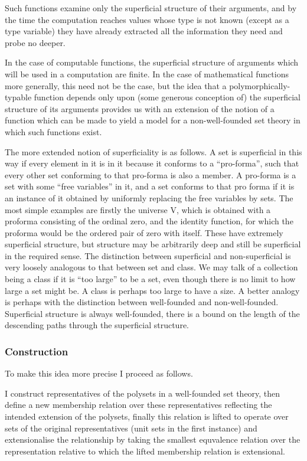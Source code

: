 \documentclass{article}
\begin{document}
\begin{article}
Such functions examine only the superficial structure of their arguments, and by the time the computation reaches values whose type is not known (except as a type variable) they have already extracted all the information they need and probe no deeper.

In the case of computable functions, the superficial structure of arguments which will be used in a computation are finite.
In the case of mathematical functions more generally, this need not be the case, but the idea that a polymorphically-typable function depends only upon (some generous conception of) the superficial structure of its arguments provides us with an extension of the notion of a function which can be made to yield a model for a non-well-founded set theory in which such functions exist.

The more extended notion of superficiality is as follows.
A set is superficial in this way if every element in it is in it because it conforms to a ``pro-forma'', such that every other set conforming to that pro-forma is also a member.
A pro-forma is a set with some ``free variables'' in it, and a set conforms to that pro forma if it is an instance of it obtained by uniformly replacing the free variables by sets.
The most simple examples are firstly the universe V, which is obtained with a proforma consisting of the ordinal zero, and the identity function, for which the proforma would be the ordered pair of zero with itself.
These have extremely superficial structure, but structure may be arbitrarily deep and still be superficial in the required sense.
The distinction between superficial and non-superficial is very loosely analogous to that between set and class.
We may talk of a collection being a class if it is ``too large'' to be a set, even though there is no limit to how large a set might be.
A class is perhaps too large to have a size.
A better analogy is perhaps with the distinction between well-founded and non-well-founded.
Superficial structure is always well-founded, there is a bound on the length of the descending paths through the superficial structure.

\subsubsection{Construction}
To make this idea more precise I proceed as follows.

I construct representatives of the polysets in a well-founded set theory, then define a new membership relation over these representatives reflecting the intended extension of the polysets, finally this relation is lifted to operate over sets of the original representatives (unit sets in the first instance) and extensionalise the relationship by taking the smallest equvalence relation over the representation relative to which the lifted membership relation is extensional.


\end{article}
\end{document}
